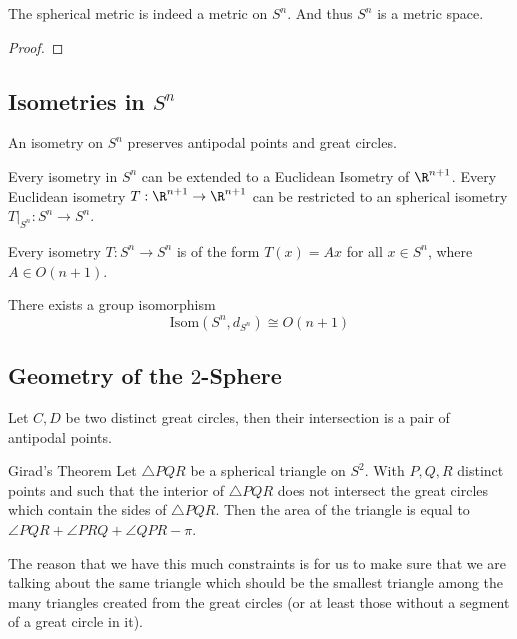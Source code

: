 \begin{prp}{}{} The spherical metric is indeed a metric on $S^n$. And thus $S^n$ is a metric space. \tcbline
\begin{proof}
\end{proof}
\end{prp}

\subsection{Isometries in $S^n$}
\begin{prp}{}{} An isometry on $S^n$ preserves antipodal points and great circles. 
\end{prp}

\begin{prp}{}{} Every isometry in $S^n$ can be extended to a Euclidean Isometry of $\R^{n+1}$. Every Euclidean isometry $T:\R^{n+1}\to\R^{n+1}$ can be restricted to an spherical isometry $T|_{S^n}:S^n\to S^n$. 
\end{prp}

\begin{prp}{}{} Every isometry $T:S^n\to S^n$ is of the form $T(x)=Ax$ for all $x\in S^n$, where $A\in O(n+1)$. 
\end{prp}

\begin{crl}{}{} There exists a group isomorphism $$\text{Isom}(S^n,d_{S^n})\cong O(n+1) $$
\end{crl}

\subsection{Geometry of the $2$-Sphere}
\begin{prp}{}{} Let $C,D$ be two distinct great circles, then their intersection is a pair of antipodal points. 
\end{prp}

\begin{thm}{Girad's Theorem}{} Let $\triangle PQR$ be a spherical triangle on $S^2$. With $P,Q,R$ distinct points and such that the interior of $\triangle PQR$ does not intersect the great circles which contain the sides of $\triangle PQR$. Then the area of the triangle is equal to $\angle PQR+\angle PRQ+\angle QPR-\pi$. 
\end{thm}

The reason that we have this much constraints is for us to make sure that we are talking about the same triangle which should be the smallest triangle among the many triangles created from the great circles (or at least those without a segment of a great circle in it). 

